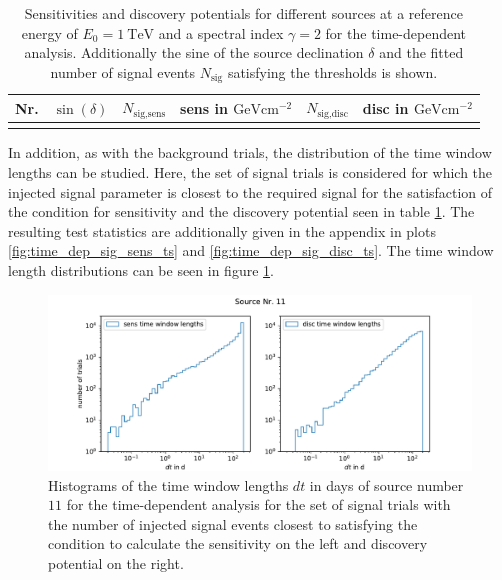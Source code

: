 \begin{table}
  \centering
  \caption{Sensitivities and discovery potentials for different sources at a reference energy of $E_0 = \SI{1}{\tera\electronvolt}$ and a spectral index $\gamma=2$ for the time-dependent analysis. Additionally the sine of the source declination $\delta$ and the fitted number of signal events $N_\text{sig}$ satisfying the thresholds is shown.}
  \begin{tabular}{ccrcrc}
    \toprule
    Nr. & $\sin{(\delta)}$ & $N_\text{sig,sens}$ &  sens in $\si{\giga\electronvolt\centi\meter\tothe{-2}}$ & $N_\text{sig,disc}$ & disc in $\si{\giga\electronvolt\centi\meter\tothe{-2}}$ \\
    \toprule
      
    \toprule
    \label{tab:sens_disc_time_dep}
  \end{tabular}
\end{table}
In addition, as with the background trials, the distribution of the time window lengths can be studied.
Here, the set of signal trials is considered for which the injected signal parameter is closest to the required signal for the satisfaction of the condition for sensitivity and the discovery potential seen in table \ref{tab:sens_disc_time_dep}.
The resulting test statistics are additionally given in the appendix in plots \ref{fig:time_dep_sig_sens_ts} and \ref{fig:time_dep_sig_disc_ts}.
The time window length distributions can be seen in figure \ref{fig:sens_disc_dt_1}.
\begin{figure}
    \centering
    \includegraphics[width=\linewidth]{Plots/05_csky/9_years_gfu_gold_disc_sens_time_dep_dt_1.pdf}
    \caption{Histograms of the time window lengths $dt$ in days of source number $\num{11}$ for the time-dependent analysis for the set of signal trials with the number of injected signal events closest to satisfying the condition to calculate the sensitivity on the left and discovery potential on the right.}
    \label{fig:sens_disc_dt_1}
\end{figure}
